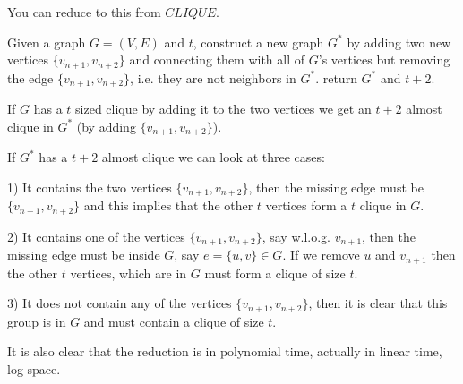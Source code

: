 \documentclass{lehramt-informatik-aufgabe}
\begin{document}
\begin{liAntwort}
You can reduce to this from $CLIQUE$.

Given a graph $G=(V,E)$ and $t$, construct a new graph $G^*$ by adding
two new vertices $\{v_{n+1},v_{n +2}\}$ and connecting them with all of
$G$'s vertices but removing the edge $\{v_{n+1},v_{n+2}\}$, i.e. they
are not neighbors in $G^*$. return $G^*$ and $t+2$.

If $G$ has a $t$ sized clique by adding it to the two vertices we get an
$t+2$ almost clique in $G^*$ (by adding $\{v_{n+1},v_{n+2}\}$).

If $G^*$ has a $t+2$ almost clique we can look at three cases:

1) It contains the two vertices $\{v_{n+1},v_{n+2}\}$, then the missing
edge must be $\{v_{n+1},v_{n+2}\}$ and this implies that the other $t$
vertices form a $t$ clique in $G$.

2) It contains one of the vertices $\{v_{n+1},v_{n+2}\}$, say w.l.o.g.
$v_{n+1}$, then the missing edge must be inside $G$, say $e=\{u,v\}\in
G$. If we remove $u$ and $v_{n+1}$ then the other $t$ vertices, which
are in $G$ must form a clique of size $t$.

3) It does not contain any of the vertices $\{v_{n+1},v_{n+2}\}$, then
it is clear that this group is in $G$ and must contain a clique of size
$t$.

It is also clear that the reduction is in polynomial time, actually in
linear time, log-space.
\end{liAntwort}
\end{document}
